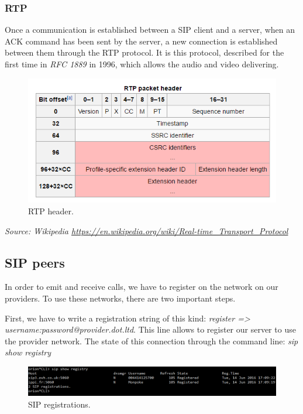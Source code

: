 \subsubsection{RTP}
Once a communication is established between a SIP client and a server, when an ACK command has been sent by the server, a new connection is established between them through the RTP protocol. It is this protocol, described for the first time in \textit{RFC 1889} in 1996, which allows the audio and video delivering. 

 
\begin{figure}[H]
  \caption{RTP header.}
  \centering
    \includegraphics[width=1\textwidth]{img/rtpheader.png}
\end{figure}
\textit{\small{Source: Wikipedia \url{https://en.wikipedia.org/wiki/Real-time_Transport_Protocol}}}


\subsection{SIP peers}
In order to emit and receive calls, we have to register on the network on our providers. To use these networks, there are two important steps. 


First, we have to write a registration string of this kind: \textit{register => username:password@provider.dot.ltd}. This line allows to register our server to use the provider network. The state of this connection through the command line: \textit{sip show registry}

\begin{figure}[H]
  \caption{SIP registrations.}
  \centering
    \includegraphics[width=1\textwidth]{img/sipshowregistry.png}
\end{figure}



